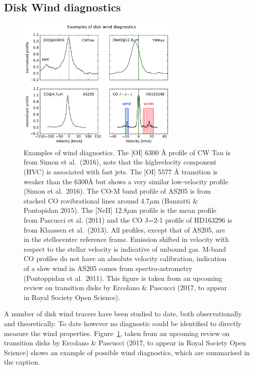 \documentclass[10pt,fleqn,twoside]{article}
\begin{document}
\subsection{Disk Wind diagnostics}
 \begin{figure}
   \centering
   \includegraphics[width=0.7\textwidth]{winds.pdf}

   \caption{Examples of wind diagnostics. The [OI] 6300 Å profile of CW Tau is from Simon et al.\ (2016), note that the highvelocity
component (HVC) is associated with fast jets. The [OI] 5577 Å transition is weaker than the 6300Å but shows a
very similar low-velocity profile (Simon et al.\ 2016). The CO-M band profile of AS205 is from stacked CO rovibrational
lines around 4.7$\mu$m (Banzatti \& Pontopidan 2015). The [NeII] 12.8$\mu$m profile is the mean profile from Pascucci et al.
(2011) and the CO J=2-1 profile of HD163296 is from Klaassen et al.\ (2013). All profiles, except that of AS205, are in
the stellocentrc reference frame. Emission shifted in velocity with respect to the stellar velocity is indicative of unbound
gas. M-band CO profiles do not have an absolute velocity calibration, indication of a slow wind in AS205 comes from
spectro-astrometry (Pontoppidan et al.\ 2011). This figure is
taken from an upcoming review on transition disks by Ercolano \& Pascucci (2017, to appear in Royal
Society Open Science).}
              \label{fig:lines}%
    \end{figure}

A number of disk wind tracers have been studied to date, both
observationally and theoretically. To date however no diagnostic could
be identified to directly measure the wind properties. 
Figure~\ref{fig:lines}, taken from an upcoming review on transition disks by
Ercolano \& Pascucci (2017, to appear in Royal Society Open Science)
shows an example of possible wind diagnostics, which are summarised in
the caption.  
\end{document}

